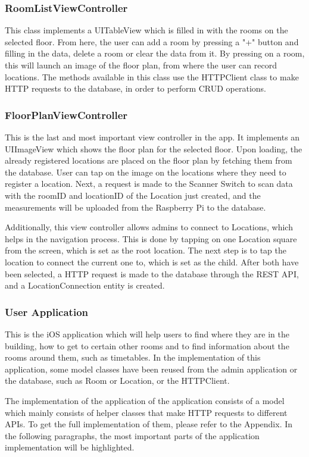 \subsubsection*{RoomListViewController}
This class implements a UITableView which is filled in with the rooms on the selected floor. From here, the user can add a room by pressing a "+" button and filling in the data, delete a room or clear the data from it. By pressing on a room, this will launch an image of the floor plan, from where the user can record locations. The methods available in this class use the HTTPClient class to make HTTP requests to the database, in order to perform CRUD operations.

\subsubsection*{FloorPlanViewController}
This is the last and most important view controller in the app. It implements an UIImageView which shows the floor plan for the selected floor. Upon loading, the already registered locations are placed on the floor plan by fetching them from the database. User can tap on the image on the locations where they need to register a location. Next, a request is made to the Scanner Switch to scan data with the roomID and locationID of the Location just created, and the measurements will be uploaded from the Raspberry Pi to the database. 

Additionally, this view controller allows admins to connect to Locations, which helps in the  navigation process. This is done by tapping on one Location square from the screen, which is set as the root location. The next step is to tap the location to connect the current one to, which is set as the child. After both have been selected, a HTTP request is made to the database through the REST API, and a LocationConnection entity is created.

\subsubsection{User Application}
This is the iOS application which will help users to find where they are in the building, how to get to certain other rooms and to find information about the rooms around them, such as timetables. In the implementation of this application, some model classes have been reused from the admin application or the database, such as Room or Location, or the HTTPClient.

The implementation of the application of the application consists of a model which mainly consists of helper classes that make HTTP requests to different APIs. To get the full implementation of them, please refer to the Appendix. In the following paragraphs, the most important parts of the application implementation will be highlighted.


